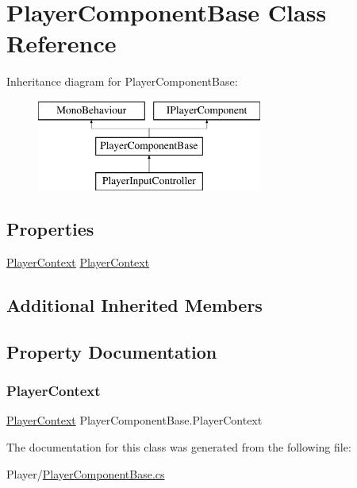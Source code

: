 \hypertarget{class_player_component_base}{}\section{Player\+Component\+Base Class Reference}
\label{class_player_component_base}
Inheritance diagram for Player\+Component\+Base\+:\begin{figure}[H]
\begin{center}
\leavevmode
\includegraphics[height=3.000000cm]{class_player_component_base}
\end{center}
\end{figure}
\subsection*{Properties}
\begin{DoxyCompactItemize}
\item 
\mbox{\hyperlink{class_player_context}{Player\+Context}} \mbox{\hyperlink{class_player_component_base_a4827e50bbc0ff92533c4a4dda0708202}{Player\+Context}}
\end{DoxyCompactItemize}
\subsection*{Additional Inherited Members}


\subsection{Property Documentation}
\mbox{\label{class_player_component_base_a4827e50bbc0ff92533c4a4dda0708202}} 
\subsubsection{\texorpdfstring{Player\+Context}{PlayerContext}}
{\footnotesize\ttfamily \mbox{\hyperlink{class_player_context}{Player\+Context}} Player\+Component\+Base.\+Player\+Context\hspace{0.3cm}{\ttfamily [get]}}



The documentation for this class was generated from the following file\+:\begin{DoxyCompactItemize}
\item 
Player/\mbox{\hyperlink{_player_component_base_8cs}{Player\+Component\+Base.\+cs}}\end{DoxyCompactItemize}
